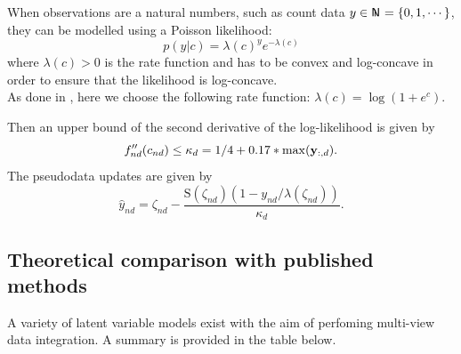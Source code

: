 When observations are a natural numbers, such as count data $y \in \N = \{0,1,\cdots\}$, they can be modelled using a Poisson likelihood:
\begin{equation*}
	p(y|c) = \lambda(c)^y e^{-\lambda(c)}
\end{equation*}
where $\lambda(c)>0$ is the rate function and has to be convex and log-concave in order to ensure that the likelihood is log-concave.\\
As done in \cite{Seeger2012}, here we choose the following rate function: $\lambda(c)=\log(1+e^c)$.

Then an upper bound of the second derivative of the log-likelihood is given by
\begin{equation*}
	f''_{nd}(c_{nd}) \leq \kappa_d = 1/4 + 0.17*\max({\bf y}_{:,d}).
\end{equation*}
The pseudodata updates are given by
\begin{equation*}
	\hat{y}_{nd} = \zeta_{nd} - \frac{\mathrm{S}(\zeta_{nd})(1-y_{nd}/\lambda(\zeta_{nd}))}{\kappa_d}.
\end{equation*}

\pagebreak
	 
\subsection{Theoretical comparison with published methods}

A variety of latent variable models exist with the aim of perfoming multi-view data integration. A summary is provided in the table below. 

